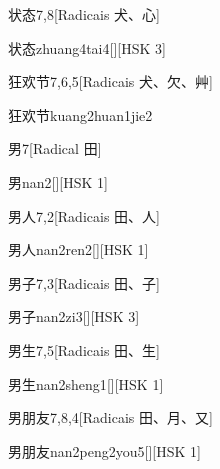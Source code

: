 \begin{entry}{状态}{7,8}[Radicais ⽝、⼼]
  \begin{phonetics}{状态}{zhuang4tai4}[][HSK 3]
  \end{phonetics}
\end{entry}

\begin{entry}{狂欢节}{7,6,5}[Radicais ⽝、⽋、⾋]
  \begin{phonetics}{狂欢节}{kuang2huan1jie2}
  \end{phonetics}
\end{entry}

\begin{entry}{男}{7}[Radical ⽥]
  \begin{phonetics}{男}{nan2}[][HSK 1]
  \end{phonetics}
\end{entry}

\begin{entry}{男人}{7,2}[Radicais ⽥、⼈]
  \begin{phonetics}{男人}{nan2ren2}[][HSK 1]
  \end{phonetics}
\end{entry}

\begin{entry}{男子}{7,3}[Radicais ⽥、⼦]
  \begin{phonetics}{男子}{nan2zi3}[][HSK 3]
  \end{phonetics}
\end{entry}

\begin{entry}{男生}{7,5}[Radicais ⽥、⽣]
  \begin{phonetics}{男生}{nan2sheng1}[][HSK 1]
  \end{phonetics}
\end{entry}

\begin{entry}{男朋友}{7,8,4}[Radicais ⽥、⽉、⼜]
  \begin{phonetics}{男朋友}{nan2peng2you5}[][HSK 1]
  \end{phonetics}
\end{entry}


